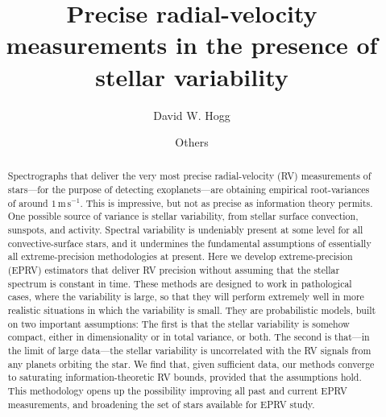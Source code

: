 \documentclass[modern]{aastex63}
\newcommand{\unit}[1]{\mathrm{#1}}
\newcommand{\m}{\unit{m}}
\newcommand{\s}{\unit{s}}
\newcommand{\ms}{\m\,\s^{-1}}
\begin{document}
\sloppy\sloppypar\raggedbottom\frenchspacing %
\graphicspath{ {figures/} }

\title{\textbf{Precise radial-velocity measurements in the presence of stellar variability}}

\author[0000-0003-2866-9403]{David W. Hogg}

\author{Others}

\begin{abstract}\noindent
Spectrographs that deliver the very most precise radial-velocity (RV)
measurements of stars---for the purpose of detecting exoplanets---are
obtaining empirical root-variances of around $1\,\ms$.
This is impressive, but not as precise as information theory
permits.
One possible source of variance is stellar variability, from stellar
surface convection, sunspots, and activity.
Spectral variability is undeniably present at some level for all
convective-surface stars, and it undermines the fundamental
assumptions of essentially all extreme-precision methodologies at
present.
Here we develop extreme-precision (EPRV) estimators that
deliver RV precision without assuming that the stellar spectrum is
constant in time.
These methods are designed to work in pathological cases, where the
variability is large, so that they will perform extremely well in more
realistic situations in which the variability is small.
They are probabilistic models, built on two important assumptions:
The first is that the stellar variability is somehow compact, either
in dimensionality or in total variance, or both.
The second is that---in the limit of large data---the stellar
variability is uncorrelated with the RV signals from any planets
orbiting the star.
We find that, given sufficient data, our methods converge to saturating
information-theoretic RV bounds, provided that the assumptions hold.
This methodology opens up the possibility improving all past and current
EPRV measurements, and broadening the set of stars available for EPRV study.
\end{abstract}

\end{document}
